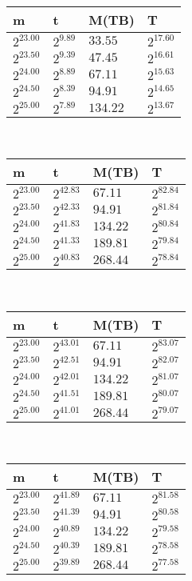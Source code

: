  \ 
\begin{tabular}{llll}
m & t & M(TB) & T \\ \hline
$2^{23.00}$ & $2^{9.89}$ & $33.55$ & $2^{17.60}$ \\
$2^{23.50}$ & $2^{9.39}$ & $47.45$ & $2^{16.61}$ \\
$2^{24.00}$ & $2^{8.89}$ & $67.11$ & $2^{15.63}$ \\
$2^{24.50}$ & $2^{8.39}$ & $94.91$ & $2^{14.65}$ \\
$2^{25.00}$ & $2^{7.89}$ & $134.22$ & $2^{13.67}$ \\
\end{tabular}
 \ 
\begin{tabular}{llll}
m & t & M(TB) & T \\ \hline
$2^{23.00}$ & $2^{42.83}$ & $67.11$ & $2^{82.84}$ \\
$2^{23.50}$ & $2^{42.33}$ & $94.91$ & $2^{81.84}$ \\
$2^{24.00}$ & $2^{41.83}$ & $134.22$ & $2^{80.84}$ \\
$2^{24.50}$ & $2^{41.33}$ & $189.81$ & $2^{79.84}$ \\
$2^{25.00}$ & $2^{40.83}$ & $268.44$ & $2^{78.84}$ \\
\end{tabular}
 \ 
\begin{tabular}{llll}
m & t & M(TB) & T \\ \hline
$2^{23.00}$ & $2^{43.01}$ & $67.11$ & $2^{83.07}$ \\
$2^{23.50}$ & $2^{42.51}$ & $94.91$ & $2^{82.07}$ \\
$2^{24.00}$ & $2^{42.01}$ & $134.22$ & $2^{81.07}$ \\
$2^{24.50}$ & $2^{41.51}$ & $189.81$ & $2^{80.07}$ \\
$2^{25.00}$ & $2^{41.01}$ & $268.44$ & $2^{79.07}$ \\
\end{tabular}
 \ 
\begin{tabular}{llll}
m & t & M(TB) & T \\ \hline
$2^{23.00}$ & $2^{41.89}$ & $67.11$ & $2^{81.58}$ \\
$2^{23.50}$ & $2^{41.39}$ & $94.91$ & $2^{80.58}$ \\
$2^{24.00}$ & $2^{40.89}$ & $134.22$ & $2^{79.58}$ \\
$2^{24.50}$ & $2^{40.39}$ & $189.81$ & $2^{78.58}$ \\
$2^{25.00}$ & $2^{39.89}$ & $268.44$ & $2^{77.58}$ \\
\end{tabular}
